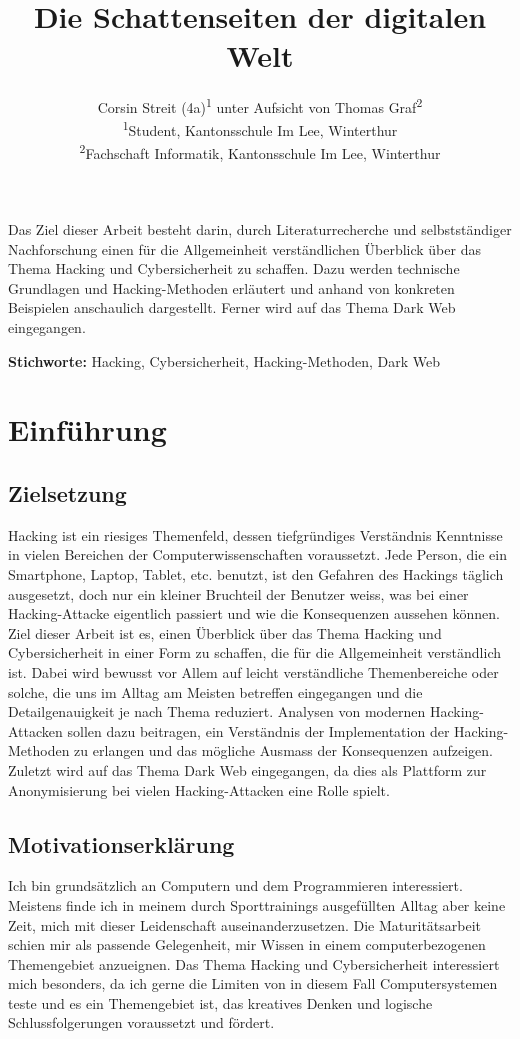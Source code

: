 \documentclass[11pt, a4paper]{article}
\title{\articletype{Hacking und Cybersicherheit} Die Schattenseiten der digitalen Welt}
\author{Corsin Streit (4a)\textsuperscript{1} unter Aufsicht von Thomas Graf\textsuperscript{2} \\
{\footnotesize \textsuperscript{1}Student, Kantonsschule Im Lee, Winterthur} \\
{\footnotesize \textsuperscript{2}Fachschaft Informatik, Kantonsschule Im Lee, Winterthur} \\
}
\date{
	\vspace{12pt}
	\begin{flushleft}
		\normalsize Winterthur, 23. Dezember 2024
	\end{flushleft}
}
\renewenvironment{abstract}
  {\begin{mdframed}[
    backgroundcolor=gray!20, 
    innertopmargin=10pt, 
    innerbottommargin=15pt, 
    innerleftmargin=15pt, 
    innerrightmargin=15pt, 
    linewidth=0pt, 
    roundcorner=0pt,
    frametitleaboveskip=5mm, 
    frametitlebelowskip=-1mm, 
    frametitle={\bfseries Abstrakt}, 
    frametitlefont={\bfseries},
    frametitlealignment=\raggedright
    ]
   \vspace{2mm}}
  {\end{mdframed}}
\newcommand{\keywords}[1]{
  \vspace{12pt} 
  \par\noindent\textbf{Stichworte:} #1
}
\begin{document}
\maketitle
\thispagestyle{firstpage}


\begin{abstract}
Das Ziel dieser Arbeit besteht darin, durch Literaturrecherche und selbstständiger Nachforschung einen für die Allgemeinheit verständlichen Überblick über das Thema Hacking und Cybersicherheit zu schaffen. Dazu werden technische Grundlagen und Hacking-Methoden erläutert und anhand von konkreten Beispielen anschaulich dargestellt. Ferner wird auf das Thema Dark Web eingegangen.
\end{abstract}

\keywords{Hacking, Cybersicherheit, Hacking-Methoden, Dark Web}

\newpage
\tableofcontents
\newpage

\section{Einführung}
\subsection{Zielsetzung}
Hacking ist ein riesiges Themenfeld, dessen tiefgründiges Verständnis Kenntnisse in vielen Bereichen der Computerwissenschaften voraussetzt. Jede Person, die ein Smartphone, Laptop, Tablet, etc. benutzt, ist den Gefahren des Hackings täglich ausgesetzt, doch nur ein kleiner Bruchteil der Benutzer weiss, was bei einer Hacking-Attacke eigentlich passiert und wie die Konsequenzen aussehen können. Ziel dieser Arbeit ist es, einen Überblick über das Thema Hacking und Cybersicherheit in einer Form zu schaffen, die für die Allgemeinheit verständlich ist. Dabei wird bewusst vor Allem auf leicht verständliche Themenbereiche oder solche, die uns im Alltag am Meisten betreffen eingegangen und die Detailgenauigkeit je nach Thema reduziert. Analysen von modernen Hacking-Attacken sollen dazu beitragen, ein Verständnis der Implementation der Hacking-Methoden zu erlangen und das mögliche Ausmass der Konsequenzen aufzeigen. Zuletzt wird auf das Thema Dark Web eingegangen, da dies als Plattform zur Anonymisierung bei vielen Hacking-Attacken eine Rolle spielt. 

\subsection{Motivationserklärung}
Ich bin grundsätzlich an Computern und dem Programmieren interessiert. Meistens finde ich in meinem durch Sporttrainings ausgefüllten Alltag aber keine Zeit, mich mit dieser Leidenschaft auseinanderzusetzen. Die Maturitätsarbeit schien mir als passende Gelegenheit, mir Wissen in einem computerbezogenen Themengebiet anzueignen. Das Thema Hacking und Cybersicherheit interessiert mich besonders, da ich gerne die Limiten von in diesem Fall Computersystemen teste und es ein Themengebiet ist, das kreatives Denken und logische Schlussfolgerungen voraussetzt und fördert.
\end{document}
